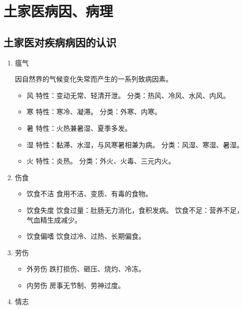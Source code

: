 \documentclass[cn,hazy,blue,12pt,normal,founder]{elegantnote}
\begin{document}
\section{土家医病因、病理}

\subsection{土家医对疾病病因的认识}

\begin{enumerate}
  \item 瘟气

  因自然界的气候变化失常而产生的一系列致病因素。

  \begin{itemize}
    \item 风
    \subitem 特性：变动无常、轻清开泄。
    \subitem 分类：热风、冷风、水风、内风。

    \item 寒
    \subitem 特性：寒冷、凝滞。
    \subitem 分类：外寒、内寒。
    \item 暑
    \subitem 特性：火热兼暑湿、夏季多发。
    \item 湿
    \subitem 特性：黏滞、水湿，与风寒暑相兼为病。
    \subitem 分类：风湿、寒湿、暑湿。
    \item 火
    \subitem 特性：炎热。
    \subitem 分类：外火、火毒、三元内火。
  \end{itemize}

  \item 伤食

  \begin{itemize}
    \item 饮食不洁
    \subitem 食用不洁、变质、有毒的食物。
    \item 饮食失度
    \subitem 饮食过量：肚肠无力消化，食积发病。
    \subitem 饮食不足：营养不足，气血精生成减少。
    \item 饮食偏嗜
    \subitem 饮食过冷、过热、长期偏食。
  \end{itemize}

  \item 劳伤

  \begin{itemize}
    \item 外劳伤
    \subitem 跌打损伤、砸压、烧灼、冷冻。
    \item 内劳伤
    \subitem 房事无节制、劳神过度。
  \end{itemize}

  \item 情志


\end{enumerate}
\end{document}
